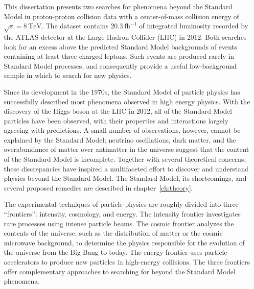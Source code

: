 

This dissertation presents two searches for phenomena beyond the Standard Model in proton-proton collision data with a center-of-mass collision energy of $\sqrt{s}=\SI{8}{\tera\electronvolt}$. The dataset contains $\SI{20.3}{\femto\barn\tothe{-1}}$ of integrated luminosity recorded by the ATLAS detector at the Large Hadron Collider (LHC) in 2012. Both searches look for an excess above the predicted Standard Model backgrounds of events containing at least three charged leptons. Such events are produced rarely in Standard Model processes, and consequently provide a useful low-background sample in which to search for new physics. 

Since its development in the 1970s, the Standard Model of particle physics has successfully described most phenomena observed in high energy physics. With the discovery of the Higgs boson at the LHC in 2012, all of the Standard Model particles have been observed, with their properties and interactions largely agreeing with predictions. A small number of observations, however, cannot be explained by the Standard Model; neutrino oscillations, dark matter, and the overabundance of matter over antimatter in the universe suggest that the content of the Standard Model is incomplete. Together with several theoretical concerns, these discrepancies have inspired a multifaceted effort to discover and understand physics beyond the Standard Model. The Standard Model, its shortcomings, and several proposed remedies are described in chapter~\ref{ch:theory}.

The experimental techniques of particle physics are roughly divided into three ``frontiers'': intensity, cosmology, and energy. The intensity frontier investigates rare processes using intense particle beams. The cosmic frontier analyzes the contents of the universe, such as the distribution of matter or the cosmic microwave background, to determine the physics responsible for the evolution of the universe from the Big Bang to today. The energy frontier uses particle accelerators to produce new particles in high-energy collisions. The three frontiers offer complementary approaches to searching for beyond the Standard Model phenomena.

